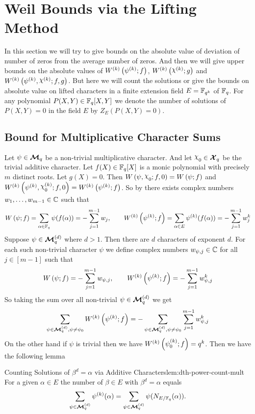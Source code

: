 \section{Weil Bounds via the Lifting Method}\label{sec:weil-lifted-bounds}

In this section we will try to give bounds on the absolute value of deviation of number of zeros from the average number of zeros. And then we will give upper bounds on the absolute values of $W^{(k)}\left(\psi^{(k)};f\right)$, $\Wchil{k}{g}$ and $\Wmixl{k}{f}{g}$. But here we will count the solutions or give the bounds on absolute value on lifted characters in a finite extension field $E=\mathbb{F}_{q^k}$ of $\mathbb{F}_q$.  For any polynomial $P(X,Y)\in\mathbb{F}_q[X,Y]$ we denote the number of solutions of $P(X,Y)=0$ in the field $ E$ by $Z_E(P(X,Y)=0)$.


\subsection{Bound for Multiplicative Character Sums}\label{subsec:mchar-weil-bound}
Let $\psi\in\boldsymbol{\mathcal{M}}_q$ be a non-trivial multiplicative character. And let $\chi_0\in\Xq$ be the trivial additive character. Let $f(X)\in\mathbb{F}_q[X]$ is a monic polynomial with precisely $m$ distinct roots. Let $g(X)=0$. Then $W\lt(\psi,\chi_0;f,0\rt)=\Wpsi{f}$ and $W^{(k)}\lt(\psi^{(k)},\chi_0^{(k)};f,0\rt)=\Wpsil{k}{f}$. So by \LiftedLRootscor there exists complex numbers $w_1,\dots, w_{m-1}\in\mathbb{C}$ such that \begin{equation}\label{eq:mchar-complex-root-sum}
  W\left(\psi;f\right)=\sum_{\alpha\in\mathbb{F}_{q}}\psi(f(\alpha))=-\sum_{j=1}^{m-1}w_j,\qquad W^{(k)}\left(\psi^{(k)};f\right)=\sum_{\alpha\in E}\psi^{(k)}(f(\alpha))=-\sum_{j=1}^{m-1}w_j^k
\end{equation}
Suppose $\psi\in\boldsymbol{\mathcal{M}}_q^{(d)}$ where $d>1$. Then there are $d$ characters of exponent $d$. For each such non-trivial character $\psi$ we define complex numbers $w_{\psi,j}\in\mathbb{C}$ for all $j\in[m-1]$ such that  $$W\left(\psi;f\right)=-\sum_{j=1}^{m-1}w_{\psi,j},\qquad W^{(k)}\left(\psi^{(k)};f\right)=-\sum_{j=1}^{m-1}w_{\psi,j}^k$$So taking the sum over all non-trivial $\psi\in\boldsymbol{\mathcal{M}}_q^{(d)}$ we get $$\sum_{\psi\in\boldsymbol{\mathcal{M}}_q^{(d)},\psi\neq \psi_0}W^{(k)}\left(\psi^{(k)};f\right)=-\sum_{\psi\in\boldsymbol{\mathcal{M}}_q^{(d)},\psi\neq \psi_0}\sum_{j=1}^{m-1}w_{\psi,j}^k$$On the other hand if $\psi$ is trivial then we have $W^{(k)}\left(\psi_0^{(k)};f\right)=q^k$. Then we have the following lemma
\begin{lemma}{Counting Solutions of $\beta^d=\alpha$ via Additive Characters}{lem:dth-power-count-mult}
  For a given $\alpha\in E$ the number of $\beta\in E$ with $\beta^d=\alpha$ equals $$\sum_{\psi\in\boldsymbol{\mathcal{M}}_q^{(d)}}\psi^{(k)}(\alpha)=\sum_{\psi\in\boldsymbol{\mathcal{M}}_q^{(d)}}\psi(N_{E/\mathbb{F}_q}(\alpha)).$$
\end{lemma}
